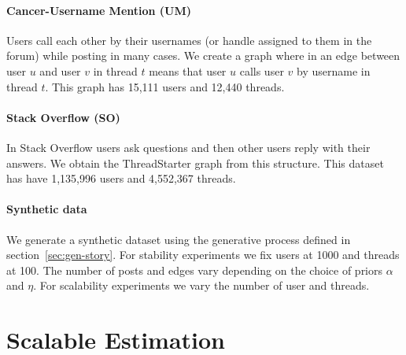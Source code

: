 \documentclass{sig-alternate}
\newcommand{\comment}[1]{\textcolor{red}{[#1]}}
\begin{document}
\paragraph{Cancer-Username Mention (UM)} Users call each other by 
their usernames (or handle assigned to them in the
forum) while posting in many cases. We create a graph where in an edge between
user $u$ and user $v$ in thread $t$ means that user $u$ calls user $v$ by
username in thread $t$. This graph has 15,111 users and
12,440 threads.
\vspace*{-0.5\baselineskip}
\paragraph{Stack Overflow (SO)} In Stack Overflow users ask 
questions and then other users reply with their
answers. We obtain the ThreadStarter graph from this structure. This dataset has
have 1,135,996 users and 4,552,367 threads.
\vspace*{-0.5\baselineskip}
\paragraph{Synthetic data} We generate a synthetic dataset 
using the generative process defined in
section~\ref{sec:gen-story}. For stability experiments 
we fix users at 1000 and threads at 100. The number of 
posts and edges vary depending on the choice of priors $\alpha$ and $\eta$.
For scalability experiments we vary the number of user and threads.  
\section{Scalable Estimation}
\label{estimation}
\end{document}
